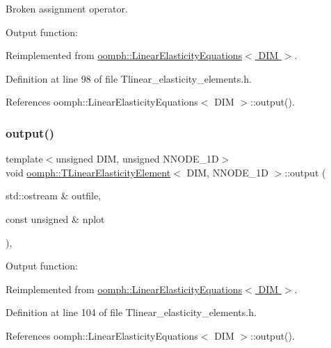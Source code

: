 Broken assignment operator. 

Output function\+: 

Reimplemented from \hyperlink{classoomph_1_1LinearElasticityEquations_a43d6b5b646f798329c1d77f64d26cdeb}{oomph\+::\+Linear\+Elasticity\+Equations$<$ D\+I\+M $>$}.



Definition at line 98 of file Tlinear\+\_\+elasticity\+\_\+elements.\+h.



References oomph\+::\+Linear\+Elasticity\+Equations$<$ D\+I\+M $>$\+::output().

\mbox{\label{classoomph_1_1TLinearElasticityElement_acb51af6914538bf87852b892dc516ec0}} 
\subsubsection{\texorpdfstring{output()}{output()}\hspace{0.1cm}{\footnotesize\ttfamily [2/4]}}
{\footnotesize\ttfamily template$<$unsigned D\+IM, unsigned N\+N\+O\+D\+E\+\_\+1D$>$ \\
void \hyperlink{classoomph_1_1TLinearElasticityElement}{oomph\+::\+T\+Linear\+Elasticity\+Element}$<$ D\+IM, N\+N\+O\+D\+E\+\_\+1D $>$\+::output (\begin{DoxyParamCaption}\item[{std\+::ostream \&}]{outfile,  }\item[{const unsigned \&}]{nplot }\end{DoxyParamCaption})\hspace{0.3cm}{\ttfamily [inline]}, {\ttfamily [virtual]}}



Output function\+: 



Reimplemented from \hyperlink{classoomph_1_1LinearElasticityEquations_ad651870ca4e0f45f7023407656d034ee}{oomph\+::\+Linear\+Elasticity\+Equations$<$ D\+I\+M $>$}.



Definition at line 104 of file Tlinear\+\_\+elasticity\+\_\+elements.\+h.



References oomph\+::\+Linear\+Elasticity\+Equations$<$ D\+I\+M $>$\+::output().

